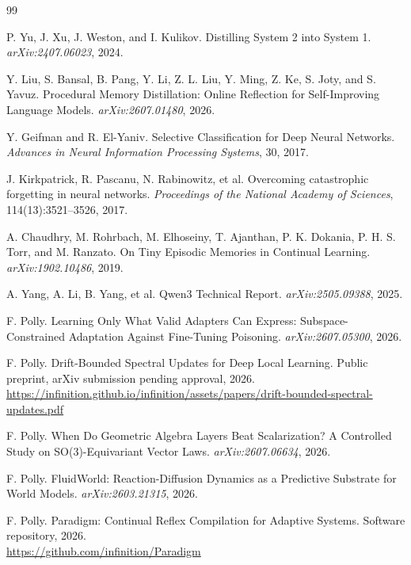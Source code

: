 \documentclass[10pt]{article}
\begin{document}
\begin{thebibliography}{99}

P. Yu, J. Xu, J. Weston, and I. Kulikov.
\newblock Distilling System 2 into System 1.
\newblock \emph{arXiv:2407.06023}, 2024.

Y. Liu, S. Bansal, B. Pang, Y. Li, Z. L. Liu, Y. Ming, Z. Ke, S. Joty, and S. Yavuz.
\newblock Procedural Memory Distillation: Online Reflection for Self-Improving Language Models.
\newblock \emph{arXiv:2607.01480}, 2026.

Y. Geifman and R. El-Yaniv.
\newblock Selective Classification for Deep Neural Networks.
\newblock \emph{Advances in Neural Information Processing Systems}, 30, 2017.

J. Kirkpatrick, R. Pascanu, N. Rabinowitz, et al.
\newblock Overcoming catastrophic forgetting in neural networks.
\newblock \emph{Proceedings of the National Academy of Sciences}, 114(13):3521--3526, 2017.

A. Chaudhry, M. Rohrbach, M. Elhoseiny, T. Ajanthan, P. K. Dokania, P. H. S. Torr, and M. Ranzato.
\newblock On Tiny Episodic Memories in Continual Learning.
\newblock \emph{arXiv:1902.10486}, 2019.

A. Yang, A. Li, B. Yang, et al.
\newblock Qwen3 Technical Report.
\newblock \emph{arXiv:2505.09388}, 2025.

F. Polly.
\newblock Learning Only What Valid Adapters Can Express: Subspace-Constrained Adaptation Against Fine-Tuning Poisoning.
\newblock \emph{arXiv:2607.05300}, 2026.

F. Polly.
\newblock Drift-Bounded Spectral Updates for Deep Local Learning.
\newblock Public preprint, arXiv submission pending approval, 2026.\\
\url{https://infinition.github.io/infinition/assets/papers/drift-bounded-spectral-updates.pdf}

F. Polly.
\newblock When Do Geometric Algebra Layers Beat Scalarization? A Controlled Study on SO(3)-Equivariant Vector Laws.
\newblock \emph{arXiv:2607.06634}, 2026.

F. Polly.
\newblock FluidWorld: Reaction-Diffusion Dynamics as a Predictive Substrate for World Models.
\newblock \emph{arXiv:2603.21315}, 2026.

F. Polly.
\newblock Paradigm: Continual Reflex Compilation for Adaptive Systems.
\newblock Software repository, 2026.\\
\url{https://github.com/infinition/Paradigm}

\end{thebibliography}
\end{document}
